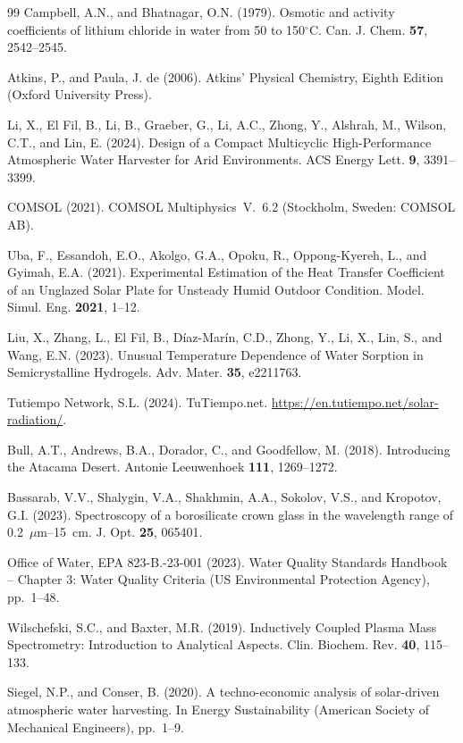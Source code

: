 \documentclass[11pt]{article}
\begin{document}
\begin{thebibliography}{99}
 Campbell, A.N., and Bhatnagar, O.N. (1979). Osmotic and activity coefficients of lithium chloride in water from 50 to 150$^\circ$C. Can. J. Chem. \textbf{57}, 2542--2545.

 Atkins, P., and Paula, J. de (2006). Atkins' Physical Chemistry, Eighth Edition (Oxford University Press).

 Li, X., El Fil, B., Li, B., Graeber, G., Li, A.C., Zhong, Y., Alshrah, M., Wilson, C.T., and Lin, E. (2024). Design of a Compact Multicyclic High-Performance Atmospheric Water Harvester for Arid Environments. ACS Energy Lett. \textbf{9}, 3391--3399.

 COMSOL (2021). COMSOL Multiphysics\textregistered\ V.~6.2 (Stockholm, Sweden: COMSOL AB).

 Uba, F., Essandoh, E.O., Akolgo, G.A., Opoku, R., Oppong-Kyereh, L., and Gyimah, E.A. (2021). Experimental Estimation of the Heat Transfer Coefficient of an Unglazed Solar Plate for Unsteady Humid Outdoor Condition. Model. Simul. Eng. \textbf{2021}, 1--12.

 Liu, X., Zhang, L., El Fil, B., D{\'i}az-Mar{\'i}n, C.D., Zhong, Y., Li, X., Lin, S., and Wang, E.N. (2023). Unusual Temperature Dependence of Water Sorption in Semicrystalline Hydrogels. Adv. Mater. \textbf{35}, e2211763.

 Tutiempo Network, S.L. (2024). TuTiempo.net. \url{https://en.tutiempo.net/solar-radiation/}.

 Bull, A.T., Andrews, B.A., Dorador, C., and Goodfellow, M. (2018). Introducing the Atacama Desert. Antonie Leeuwenhoek \textbf{111}, 1269--1272.

 Bassarab, V.V., Shalygin, V.A., Shakhmin, A.A., Sokolov, V.S., and Kropotov, G.I. (2023). Spectroscopy of a borosilicate crown glass in the wavelength range of 0.2~$\mu$m--15~cm. J. Opt. \textbf{25}, 065401.

 Office of Water, EPA 823-B.-23-001 (2023). Water Quality Standards Handbook -- Chapter 3: Water Quality Criteria (US Environmental Protection Agency), pp.~1--48.

 Wilschefski, S.C., and Baxter, M.R. (2019). Inductively Coupled Plasma Mass Spectrometry: Introduction to Analytical Aspects. Clin. Biochem. Rev. \textbf{40}, 115--133.

 Siegel, N.P., and Conser, B. (2020). A techno-economic analysis of solar-driven atmospheric water harvesting. In Energy Sustainability (American Society of Mechanical Engineers), pp.~1--9.


\end{thebibliography}
\end{document}
